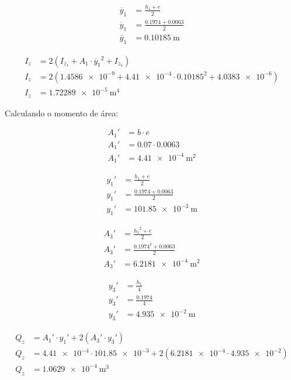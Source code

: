 \begin{align*}
  \overline{y}_1 & = \frac{h_1 + e}{2}                     \\
  \overline{y}_1 & = \frac{\num{0.1974} + \num{0.0063}}{2} \\
  \overline{y}_1 & = \boxed{\SI{0.10185}{\meter}}
\end{align*}

\begin{align*}
  I_z & = 2 \left( I_{\overline{z}_1} + A_1 \cdot {\overline{y}_1}^2 + I_{\overline{z}_3} \right)  \\
  I_z & = 2 \left( \num{1.4586e-9} + \num{4.41e-4} \cdot \num{0.10185}^2 + \num{4.0383e-6} \right) \\
  I_z & = \boxed{\SI{1.72289e-5}{\meter^4}}
\end{align*}

Calculando o momento de área:

\begin{align*}
  {A_1}' & = b \cdot e                      \\
  {A_1}' & = \num{0.07} \cdot \num{0.0063}  \\
  {A_1}' & = \boxed{\SI{4.41e-4}{\meter^2}}
\end{align*}

\begin{align*}
  {y_1}' & = \frac{h_1 + e}{2}                     \\
  {y_1}' & = \frac{\num{0.1974} + \num{0.0063}}{2} \\
  {y_1}' & = \boxed{\SI{101.85e-3}{\meter}}
\end{align*}

\begin{align*}
  {A_3}' & = \frac{{h_1}^2 + e}{2}                   \\
  {A_3}' & = \frac{\num{0.1974}^2 + \num{0.0063}}{2} \\
  {A_3}' & = \boxed{\SI{6.2181e-4}{\meter^2}}
\end{align*}

\begin{align*}
  {y_3}' & = \frac{h_1}{4}                 \\
  {y_3}' & = \frac{\num{0.1974}}{4}        \\
  {y_3}' & = \boxed{\SI{4.935e-2}{\meter}}
\end{align*}

\begin{align*}
  Q_z & = {A_1}' \cdot {y_1}' + 2 \left( {A_3}' \cdot {y_3}' \right)                                  \\
  Q_z & = \num{4.41e-4} \cdot \num{101.85e-3} + 2 \left( \num{6.2181e-4} \cdot \num{4.935e-2} \right) \\
  Q_z & = \boxed{\SI{1.0629e-4}{\meter^3}}
\end{align*}

